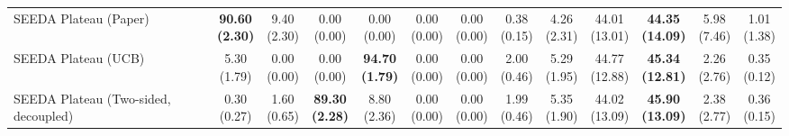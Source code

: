 \begin{table}[H]
{\begin{tabular}{l|cccccc|cccccc}
SEEDA Plateau (Paper) & \bfseries \makecell{90.60 \\ (2.30)} & \makecell{9.40 \\ (2.30)} & {\cellcolor[HTML]{C8E6C9}} \makecell{0.00 \\ (0.00)} & \makecell{0.00 \\ (0.00)} & \makecell{0.00 \\ (0.00)} & \makecell{0.00 \\ (0.00)} & \makecell{0.38 \\ (0.15)} & \makecell{4.26 \\ (2.31)} & {\cellcolor[HTML]{C8E6C9}} \makecell{44.01 \\ (13.01)} & \bfseries \makecell{44.35 \\ (14.09)} & \makecell{5.98 \\ (7.46)} & \makecell{1.01 \\ (1.38)} \\
SEEDA Plateau (UCB) & \makecell{5.30 \\ (1.79)} & \makecell{0.00 \\ (0.00)} & {\cellcolor[HTML]{C8E6C9}} \makecell{0.00 \\ (0.00)} & \bfseries \makecell{94.70 \\ (1.79)} & \makecell{0.00 \\ (0.00)} & \makecell{0.00 \\ (0.00)} & \makecell{2.00 \\ (0.46)} & \makecell{5.29 \\ (1.95)} & {\cellcolor[HTML]{C8E6C9}} \makecell{44.77 \\ (12.88)} & \bfseries \makecell{45.34 \\ (12.81)} & \makecell{2.26 \\ (2.76)} & \makecell{0.35 \\ (0.12)} \\
SEEDA Plateau (Two-sided, decoupled) & \makecell{0.30 \\ (0.27)} & \makecell{1.60 \\ (0.65)} & {\cellcolor[HTML]{C8E6C9}} \bfseries \makecell{89.30 \\ (2.28)} & \makecell{8.80 \\ (2.36)} & \makecell{0.00 \\ (0.00)} & \makecell{0.00 \\ (0.00)} & \makecell{1.99 \\ (0.46)} & \makecell{5.35 \\ (1.90)} & {\cellcolor[HTML]{C8E6C9}} \makecell{44.02 \\ (13.09)} & \bfseries \makecell{45.90 \\ (13.09)} & \makecell{2.38 \\ (2.77)} & \makecell{0.36 \\ (0.15)} \\

\end{tabular}}
\end{table}
